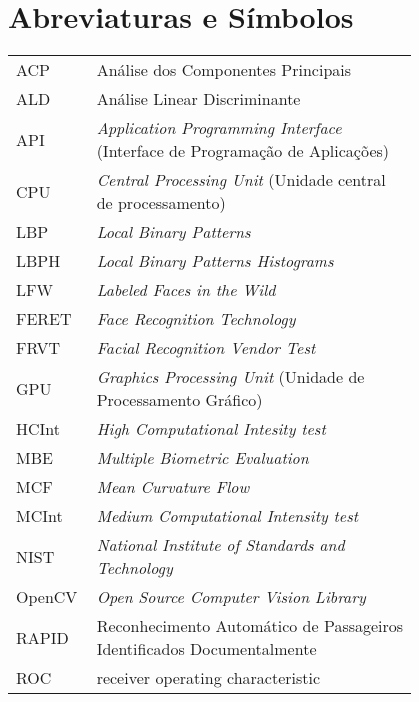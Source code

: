 \chapter*{Abreviaturas e Símbolos}

\begin{flushleft}
\begin{tabular}{l p{0.8\linewidth}}
ACP		& Análise dos Componentes Principais\\
ALD		& Análise Linear Discriminante\\
API		& \textit{Application Programming Interface} (Interface de Programação de Aplicações) \\
CPU		& \textit{Central Processing Unit} (Unidade central de processamento)\\
LBP 	& \textit{Local Binary Patterns}\\
LBPH	& \textit{Local Binary Patterns Histograms}\\
LFW		& \textit{Labeled Faces in the Wild}\\
FERET   & \textit{Face Recognition Technology}\\
FRVT    & \textit{Facial Recognition Vendor Test}\\
GPU		& \textit{Graphics Processing Unit} (Unidade de Processamento Gráfico)\\
HCInt	& \textit{High Computational Intesity test}\\
MBE		& \textit{Multiple Biometric Evaluation}\\
MCF		& \textit{Mean Curvature Flow}\\
MCInt	& \textit{Medium Computational Intensity test}\\
NIST	& \textit{National Institute of Standards and Technology} \\
OpenCV	& \textit{Open Source Computer Vision Library} \\
RAPID	& Reconhecimento Automático de Passageiros Identificados Documentalmente \\
ROC		& receiver operating characteristic\\
\end{tabular}
\end{flushleft}

